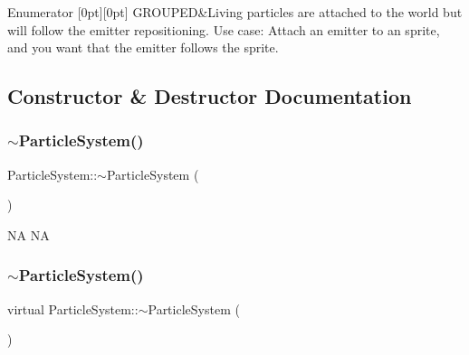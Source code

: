 \begin{DoxyEnumFields}{Enumerator}
[0pt][0pt]{}\mbox{\label{classParticleSystem_a9856f9eca1df7c6f2a2e54a1549cff27a5949e53c5710048bf96c5a5b01c280fb}} 
G\+R\+O\+U\+P\+ED&Living particles are attached to the world but will follow the emitter repositioning. Use case\+: Attach an emitter to an sprite, and you want that the emitter follows the sprite. \\
\hline

\end{DoxyEnumFields}


\subsection{Constructor \& Destructor Documentation}
\mbox{\label{classParticleSystem_a6bc725349a763b9d6817950cde16a93f}} 
\subsubsection{\texorpdfstring{$\sim$\+Particle\+System()}{~ParticleSystem()}\hspace{0.1cm}{\footnotesize\ttfamily [1/2]}}
{\footnotesize\ttfamily Particle\+System\+::$\sim$\+Particle\+System (\begin{DoxyParamCaption}{ }\end{DoxyParamCaption})\hspace{0.3cm}{\ttfamily [virtual]}}

NA  NA \mbox{\label{classParticleSystem_a3745e42099638f5abf9b924a81ad0d23}} 
\subsubsection{\texorpdfstring{$\sim$\+Particle\+System()}{~ParticleSystem()}\hspace{0.1cm}{\footnotesize\ttfamily [2/2]}}
{\footnotesize\ttfamily virtual Particle\+System\+::$\sim$\+Particle\+System (\begin{DoxyParamCaption}{ }\end{DoxyParamCaption})\hspace{0.3cm}{\ttfamily [virtual]}}

